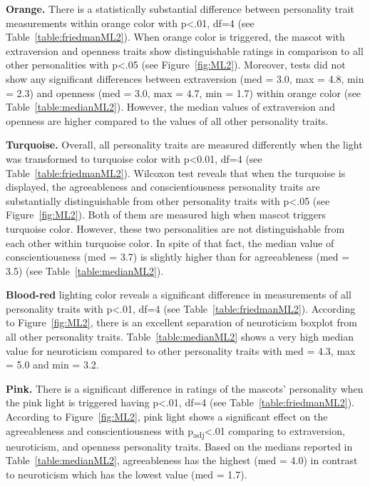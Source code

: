 \par\textbf{Orange.}
There is a statistically substantial difference between personality trait measurements within
orange color with p<.01, df=4 (see Table~\ref{table:friedmanML2}).
When orange color is triggered, the mascot with extraversion and openness traits
show distinguishable ratings in comparison to all other personalities with p<.05 (see Figure~\ref{fig:ML2}).
Moreover, tests did not show any significant differences between extraversion (med = 3.0, max = 4.8, min = 2.3)
and openness (med = 3.0, max = 4.7, min = 1.7) within orange color (see Table~\ref{table:medianML2}).
However, the median values of extraversion and openness are higher compared to the
values of all other personality traits.

\par\textbf{Turquoise.}
Overall, all personality traits are measured differently when the light was transformed to turquoise color
with p<0.01, df=4 (see Table~\ref{table:friedmanML2}).
Wilcoxon test reveals that when the turquoise is displayed, the agreeableness and conscientiousness
personality traits are substantially distinguishable from other personality traits with p<.05 (see Figure~\ref{fig:ML2}).
Both of them are measured high when mascot triggers turquoise color.
However, these two personalities are not distinguishable from each other within turquoise color.
In spite of that fact, the median value of conscientiousness (med = 3.7) is slightly higher than
for agreeableness (med = 3.5) (see Table~\ref{table:medianML2}).

\par\textbf{Blood-red}
lighting color reveals a significant difference in measurements of all personality traits
with p<.01, df=4 (see Table~\ref{table:friedmanML2}).
According to Figure~\ref{fig:ML2}, there is an excellent separation of neuroticism boxplot from all other personality traits.
Table~\ref{table:medianML2} shows a very high median value for neuroticism compared to other
personality traits with med = 4.3, max = 5.0 and min = 3.2.

\par\textbf{Pink.}
There is a significant difference in ratings of the mascots' personality when the pink light is
triggered having p<.01, df=4 (see Table~\ref{table:friedmanML2}).
According to Figure~\ref{fig:ML2}, pink light shows a significant effect on the agreeableness
and conscientiousness with p\textsubscript{adj}<.01 comparing to extraversion, neuroticism, and openness personality traits.
Based on the medians reported in Table~\ref{table:medianML2}, agreeableness has the
highest (med = 4.0) in contrast to neuroticism which has the lowest value (med = 1.7).

